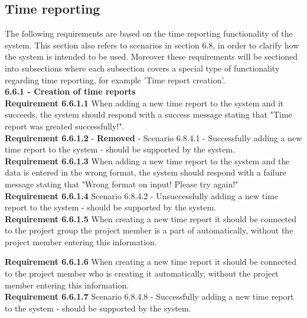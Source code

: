 \documentclass{article}
\begin{document}
\subsection{Time reporting}
The following requirements are based on the time reporting functionality of the system. This section also refers to scenarios in section 6.8, in order to clarify how the system is intended to be used. Moreover these requirements will be sectioned into subsections where each subsection covers a special type of functionality regarding time reporting, for example 'Time report creation'. \\

{\fontsize{11}{11}\selectfont \noindent\textbf{6.6.1 - Creation of time reports}} \\
\noindent\textbf{Requirement 6.6.1.1} When adding a new time report to the system and it succeeds, the system should respond with a success message stating that "Time report was greated successfully!".\\
\textbf{Requirement 6.6.1.2} - \textbf{Removed} - Scenario 6.8.4.1 - Successfully adding a new time report to the system - should be supported by the system. \\
\textbf{Requirement 6.6.1.3} When adding a new time report to the system and the data is entered in the wrong format, the system should respond with a failure message stating that "Wrong format on input! Please try again!"\\
\textbf{Requirement 6.6.1.4} Scenario 6.8.4.2 - Unsuccessfully adding a new time report to the system - should be supported by the system. \\
\textbf{Requirement 6.6.1.5} When creating a new time report it should be connected to the project group the project member is a part of automatically, without the project member entering this information. \\
\addtocounter{timeRef}{1}
\textbf{Requirement 6.6.1.6} When creating a new time report it should be connected to the project member who is creating it automatically, without the project member entering this information. \\
\textbf{Requirement 6.6.1.7} Scenario 6.8.4.8 - Successfully adding a new time report to the system - should be supported by the system. \\
\end{document}
